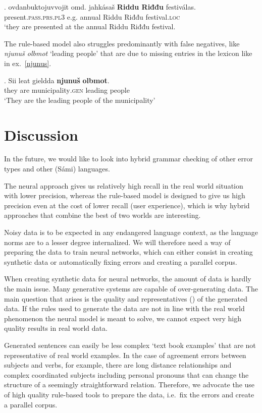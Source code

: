 \documentclass[postprint]{flammie}
\begin{document}
\exg. ovdanbuktojuvvojit omd. jahkásaš \textbf{Riddu Riđđu} festiválas.\label{ridduriddu}\\
present\textsc{.pass.prs.pl3} e.g. annual {Riddu Riđđu} festival\textsc{.loc}\\
`they are presented at the annual Riddu Riđđu festival.

The rule-based model also struggles predominantly with false negatives, like
\textit{njunuš olbmot} `leading people' that are due to missing entries in the
lexicon like in ex.~\ref{njunus}.

\exg. Sii leat gieldda \textbf{njunuš} \textbf{olbmot}.\label{njunus}\\
they are municipality\textsc{.gen} leading people\\
`They are the leading people of the municipality'



\section{Discussion}


In the future, we would like to look into hybrid grammar checking of other error
types and other (Sámi) languages.

The neural approach gives us relatively high recall in the real world situation
with lower precision, whereas the rule-based model is designed to give us high
precision even at the cost of lower recall (user experience), which is why
hybrid approaches that combine the best of two worlds are interesting.


Noisy data is to be expected in any endangered language context, as the language
norms are to a lesser degree internalized.  We will therefore need a way of
preparing the data to train neural networks, which can either consist in
creating synthetic data or automatically fixing errors and creating a parallel
corpus.

When creating synthetic data for neural networks, the amount of data is hardly
the main issue. Many generative systems are capable of over-generating data. The
main question that arises is the quality and representatives
(\cite{hamalainen2019template}) of the generated data. If the rules used to
generate the data are not in line with the real world phenomenon the neural
model is meant to solve, we cannot expect very high quality results in real
world data.

Generated sentences can easily be less complex `text book examples' that are not
representative of real world examples.  In the case of agreement errors between
subjects and verbs, for example, there are long distance relationships and
complex coordinated subjects including personal pronouns that can change the
structure of a seemingly straightforward relation.  Therefore, we advocate the
use of high quality rule-based tools  to prepare the data, i.e.\ fix the errors
and create a parallel corpus.
\end{document}

